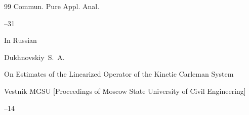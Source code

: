 \begin{thebibliography}{99}
\jour Commun. Pure Appl. Anal.




--31





\lang In Russian

\by Dukhnovskiy~S.~A.

\paper On Estimates of the Linearized Operator of the Kinetic Carleman System

\jour Vestnik MGSU \rm  [Proceedings of Moscow State University of Civil Engineering]



--14




\end{thebibliography}



\renewcommand{\baselinestretch}{0.9}





\newpage



%


